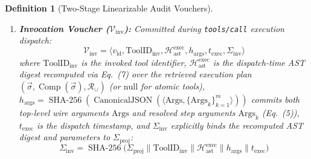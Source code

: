\documentclass[conference,10pt]{IEEEtran}
\newtheorem{definition}{Definition}
\begin{document}
\begin{definition}[Two-Stage Linearizable Audit Vouchers]
\begin{enumerate}
\begin{equation}
\begin{aligned}
    &\parallel h_q \parallel h_{\text{role}} \parallel \operatorname{Sort}(\mathcal{D}_{\text{proj}}) \parallel t_{\text{req}}\Bigr)
    \end{aligned}
    \end{equation}
    \item \textbf{Invocation Voucher ($\mathcal{V}_{\text{inv}}$):} Committed during \texttt{tools/call} execution dispatch:
    \begin{equation}
    \mathcal{V}_{\text{inv}} = \langle v_{\text{id}}, \text{ToolID}_{\text{inv}}, \mathcal{H}_{\text{ast}}^{\text{exec}}, h_{\text{args}}, t_{\text{exec}}, \Sigma_{\text{inv}} \rangle
    \end{equation}
    where $\text{ToolID}_{\text{inv}}$ is the invoked tool identifier, $\mathcal{H}_{\text{ast}}^{\text{exec}}$ is the dispatch-time AST digest recomputed via Eq.~(7) over the retrieved execution plan $(\vec{\sigma}, \operatorname{Comp}(\vec{\sigma}), \mathcal{R}_{\cup})$ (or $\text{null}$ for atomic tools), $h_{\text{args}} = \operatorname{SHA-256}(\operatorname{CanonicalJSON}(\langle \text{Args}, \{\text{Args}_k\}_{k=1}^m \rangle))$ commits both top-level wire arguments $\text{Args}$ and resolved step arguments $\text{Args}_k$ (Eq.~(5)), $t_{\text{exec}}$ is the dispatch timestamp, and $\Sigma_{\text{inv}}$ explicitly binds the recomputed AST digest and parameters to $\Sigma_{\text{proj}}$:
    \begin{equation}
    \Sigma_{\text{inv}} = \operatorname{SHA-256}\big(\Sigma_{\text{proj}} \!\parallel\! \text{ToolID}_{\text{inv}} \!\parallel\! \mathcal{H}_{\text{ast}}^{\text{exec}} \!\parallel\! h_{\text{args}} \!\parallel\! t_{\text{exec}}\big)
    \end{equation}
\end{enumerate}
\end{definition}
\end{document}
